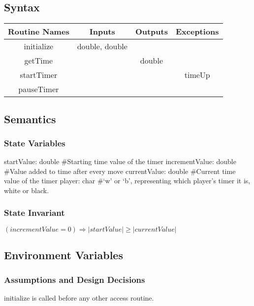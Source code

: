 \documentclass[12pt, titlepage]{article}
\begin{document}
    \subsection*{Syntax}
        \begin{center}
            \begin{tabular}{|c|c|c|c|} 
                \hline
                Routine Names & Inputs & Outputs & Exceptions \\
                \hline
                initialize & double, double & & \\
                \hline
                getTime & & double & \\
                \hline
                startTimer & & & timeUp \\
                \hline
                pauseTimer & & & \\
                \hline
            \end{tabular}
        \end{center}
    
    \subsection*{Semantics}
        \subsubsection*{State Variables}
            startValue: double \#Starting time value of the timer
            incrementValue: double \#Value added to time after every move
            currentValue: double \#Current time value of the timer
            player: char \#`w' or `b', representing which player's timer it is, white or black. \\
            
        \subsubsection*{State Invariant}
            $(incrementValue = 0) \Rightarrow |startValue| \geq |currentValue|$\\
            
    \subsection*{Environment Variables}
        \subsubsection*{Assumptions and Design Decisions}
            initialize is called before any other access routine.
            
\end{document}
